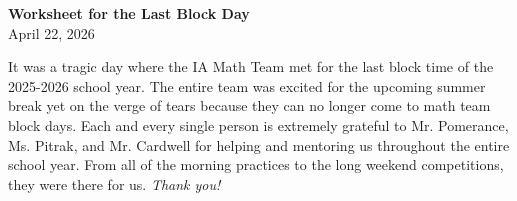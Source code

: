 \documentclass[a4paper]{article}
\begin{document}
\begin{center}
{\Large\bfseries Worksheet for the Last Block Day}\\[0.25cm]
{\large April 22, 2026}\\[1cm]
\end{center}

\vspace{.5cm}

It was a tragic day where the IA Math Team met for the last block time of the 2025-2026 school year. The entire team was excited for the upcoming summer break yet on the verge of tears because they can no longer come to math team block days. Each and every single person is extremely grateful to Mr. Pomerance, Ms. Pitrak, and Mr. Cardwell for helping and mentoring us throughout the entire school year. From all of the morning practices to the long weekend competitions, they were there for us. \textit{Thank you!}
\vspace{1cm}
\end{document}
